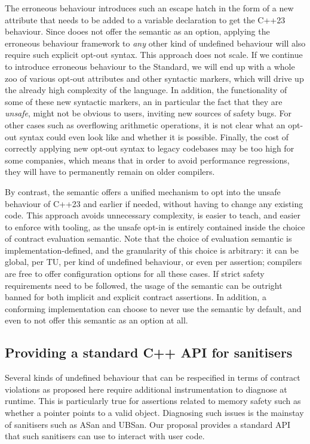The erroneous behaviour \cite{P2795R5} introduces such an escape hatch in the form of a new attribute \mbox{\tcode{[[indeterminate]]}} that needs to be added to a variable declaration to get the C++23 behaviour. Since \cite{P2795R5} dooes not offer the  semantic as an option, applying the erroneous behaviour framework to \emph{any} other kind of undefined behaviour will also require such explicit opt-out syntax. This approach does not scale. If we continue to introduce erroneous behaviour to the Standard, we will end up with a whole zoo of various opt-out attributes and other syntactic markers, which will drive up the already high complexity of the language. In addition, the functionality of some of these new syntactic markers, an in particular the fact that they are \emph{unsafe}, might not be obvious to users, inviting new sources of safety bugs. For other cases such as overflowing arithmetic operations, it is not clear what an opt-out syntax could even look like and whether it is possible. Finally, the cost of correctly applying new opt-out syntax to legacy codebases may be too high for some companies, which means that in order to avoid performance regressions, they will have to permanently remain on older compilers.

By contrast, the  semantic offers a unified mechanism to opt into the unsafe behaviour of C++23 and earlier if needed, without having to change any existing code. This approach avoids unnecessary complexity, is easier to teach, and easier to enforce with tooling, as  the unsafe opt-in is entirely contained inside the choice of contract evaluation semantic. Note that the choice of evaluation semantic is implementation-defined, and the granularity of this choice is arbitrary: it can be global, per TU, per kind of undefined behaviour, or even per assertion; compilers are free to offer configuration options for all these cases. If strict safety requirements need to be followed, the usage of the  semantic can be outright banned for both implicit and explicit contract assertions. In addition, a conforming implementation can choose to never use the  semantic by default, and even to not offer this semantic as an option at all.

\subsection{Providing a standard C++ API for sanitisers}

Several kinds of undefined behaviour that can be respecified in terms of contract violations as proposed here require additional instrumentation to diagnose at runtime. This is particularly true for assertions related to memory safety such as whether a pointer points to a valid object. Diagnosing such issues is the mainstay of sanitisers such as ASan and UBSan. Our proposal provides a standard API that such sanitisers can use to interact with user code.

